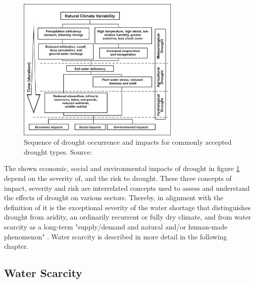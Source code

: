 \begin{figure}[!htp]
    \centering
    \includegraphics[width=0.7\textwidth]{figures/2023_MA_drought_stages.jpg}
    \decoRule
    \caption[Drought Sequences]{Sequence of drought occurrence and impacts for commonly accepted drought types. Source: \textcite{ndmcTypesDrought2023}}
    \label{fig:th_drought_sequences}
\end{figure}

The shown economic, social and environmental impacts of drought in figure \ref{fig:th_drought_sequences} depend on the severity of, and the risk to drought. These three concepts of impact, severity and risk are interrelated concepts used to assess and understand the effects of drought on various sectors. Thereby, in alignment with the definition of \textcite{vanloonDroughtHumanmodifiedWorld2016} it is the exceptional severity of the water shortage that distinguishes drought from aridity, an ordinarily recurrent or fully dry climate, and from water scarcity as a long-term "supply/demand and natural and/or human-made phenomenon" \autocites[7]{idmpDroughtWaterScarcity2022}. Water scarcity is described in more detail in the following chapter.


\subsection{Water Scarcity}\label{subsec:water_scarcity}


